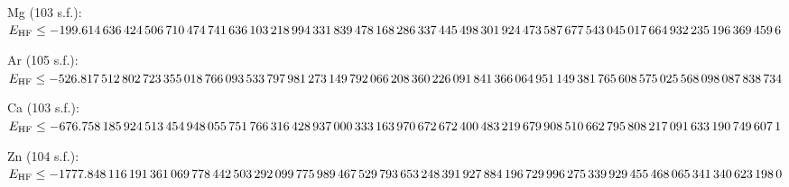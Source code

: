 \noindent Mg (103 s.f.): $E_\mathrm{HF}\le-199.614\,\allowbreak 636\,\allowbreak 424\,\allowbreak 506\,\allowbreak 710\,\allowbreak 474\,\allowbreak 741\,\allowbreak 636\,\allowbreak 103\,\allowbreak 218\,\allowbreak 994\,\allowbreak 331\,\allowbreak 839\,\allowbreak 478\,\allowbreak 168\,\allowbreak 286\,\allowbreak 337\,\allowbreak 445\,\allowbreak 498\,\allowbreak 301\,\allowbreak 924\,\allowbreak 473\,\allowbreak 587\,\allowbreak 677\,\allowbreak 543\,\allowbreak 045\,\allowbreak 017\,\allowbreak 664\,\allowbreak 932\,\allowbreak 235\,\allowbreak 196\,\allowbreak 369\,\allowbreak 459\,\allowbreak 6$\par\medskip
\noindent Ar (105 s.f.): $E_\mathrm{HF}\le-526.817\,\allowbreak 512\,\allowbreak 802\,\allowbreak 723\,\allowbreak 355\,\allowbreak 018\,\allowbreak 766\,\allowbreak 093\,\allowbreak 533\,\allowbreak 797\,\allowbreak 981\,\allowbreak 273\,\allowbreak 149\,\allowbreak 792\,\allowbreak 066\,\allowbreak 208\,\allowbreak 360\,\allowbreak 226\,\allowbreak 091\,\allowbreak 841\,\allowbreak 366\,\allowbreak 064\,\allowbreak 951\,\allowbreak 149\,\allowbreak 381\,\allowbreak 765\,\allowbreak 608\,\allowbreak 575\,\allowbreak 025\,\allowbreak 568\,\allowbreak 098\,\allowbreak 087\,\allowbreak 838\,\allowbreak 734$\par\medskip
\noindent Ca (103 s.f.): $E_\mathrm{HF}\le-676.758\,\allowbreak 185\,\allowbreak 924\,\allowbreak 513\,\allowbreak 454\,\allowbreak 948\,\allowbreak 055\,\allowbreak 751\,\allowbreak 766\,\allowbreak 316\,\allowbreak 428\,\allowbreak 937\,\allowbreak 000\,\allowbreak 333\,\allowbreak 163\,\allowbreak 970\,\allowbreak 672\,\allowbreak 672\,\allowbreak 400\,\allowbreak 483\,\allowbreak 219\,\allowbreak 679\,\allowbreak 908\,\allowbreak 510\,\allowbreak 662\,\allowbreak 795\,\allowbreak 808\,\allowbreak 217\,\allowbreak 091\,\allowbreak 633\,\allowbreak 190\,\allowbreak 749\,\allowbreak 607\,\allowbreak 1$\par\medskip
\noindent Zn (104 s.f.): $E_\mathrm{HF}\le-1777.848\,\allowbreak 116\,\allowbreak 191\,\allowbreak 361\,\allowbreak 069\,\allowbreak 778\,\allowbreak 442\,\allowbreak 503\,\allowbreak 292\,\allowbreak 099\,\allowbreak 775\,\allowbreak 989\,\allowbreak 467\,\allowbreak 529\,\allowbreak 793\,\allowbreak 653\,\allowbreak 248\,\allowbreak 391\,\allowbreak 927\,\allowbreak 884\,\allowbreak 196\,\allowbreak 729\,\allowbreak 996\,\allowbreak 275\,\allowbreak 339\,\allowbreak 929\,\allowbreak 455\,\allowbreak 468\,\allowbreak 065\,\allowbreak 341\,\allowbreak 340\,\allowbreak 623\,\allowbreak 198\,\allowbreak 0$\par\medskip
